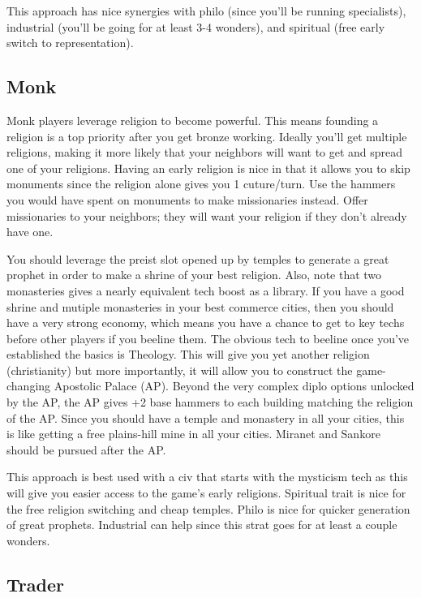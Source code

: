 \documentclass[10pt]{article}
\begin{document}
This approach has nice synergies with philo (since you'll be running specialists), industrial (you'll be
going for at least 3-4 wonders), and spiritual (free early switch to representation).

\subsection*{Monk}

Monk players leverage religion to become powerful. This means founding
a religion is a top priority after you get bronze working. Ideally
you'll get multiple religions, making it more likely that your
neighbors will want to get and spread one of your religions. Having an
early religion is nice in that it allows you to skip monuments since
the religion alone gives you 1 cuture/turn. Use the hammers you would
have spent on monuments to make missionaries instead. Offer
missionaries to your neighbors; they will want your religion if they
don't already have one.

You should leverage the preist slot opened up
by temples to generate a great prophet in order to make a shrine of
your best religion. Also, note that two monasteries gives a nearly
equivalent tech boost as a library. If you have a good shrine and
mutiple monasteries in your best commerce cities, then you should have
a very strong economy, which means you have a chance to get to key
techs before other players if you beeline them. The obvious tech to
beeline once you've established the basics is Theology. This will give
you yet another religion (christianity) but more importantly, it will
allow you to construct the game-changing Apostolic Palace (AP). Beyond
the very complex diplo options unlocked by the AP, the AP gives +2
base hammers to each building matching the religion of the AP. Since
you should have a temple and monastery in all your cities, this is
like getting a free plains-hill mine in all your cities.  Miranet and
Sankore should be pursued after the AP.

This approach is best used with a civ that starts with the mysticism tech as this will give you easier access
to the game's early religions. Spiritual trait is nice for the free religion switching and cheap temples.
Philo is nice for quicker generation of great prophets. Industrial can help since this strat goes for at least
a couple wonders.

\subsection*{Trader}
\end{document}

